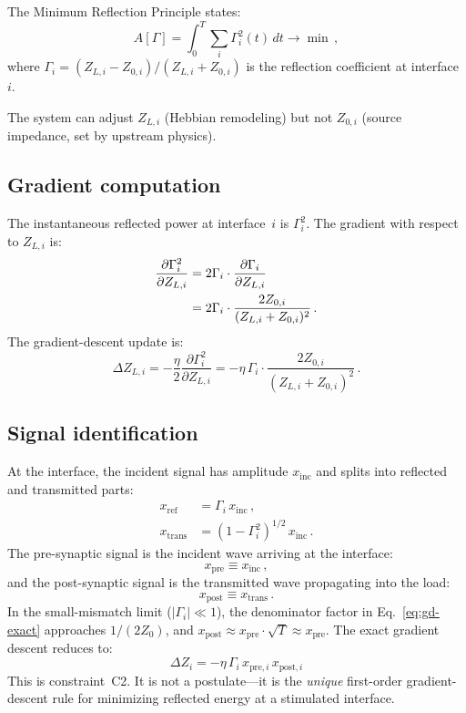 \documentclass[aps,pre,twocolumn,superscriptaddress,floatfix]{revtex4-2}
\begin{document}
The Minimum Reflection Principle states:
\begin{equation}
  A[\Gamma] = \int_0^T \sum_i \Gamma_i^2(t)\,dt \to \min\,,
  \label{eq:MRP}
\end{equation}
where $\Gamma_i = (Z_{L,i} - Z_{0,i})/(Z_{L,i} + Z_{0,i})$
is the reflection coefficient at interface~$i$.

The system can adjust $Z_{L,i}$ (Hebbian remodeling) but not
$Z_{0,i}$ (source impedance, set by upstream physics).

\subsection{Gradient computation}

The instantaneous reflected power at interface~$i$ is
$\Gamma_i^2$.  The gradient with respect to
$Z_{L,i}$ is:
\begin{align}
  \frac{\partial \Gamma_i^2}{\partial Z_{L,i}}
  &= 2\Gamma_i \cdot \frac{\partial \Gamma_i}{\partial Z_{L,i}} \notag \\
  &= 2\Gamma_i \cdot \frac{2Z_{0,i}}{(Z_{L,i}+Z_{0,i})^2}\,.
  \label{eq:gradient}
\end{align}
The gradient-descent update is:
\begin{equation}
  \Delta Z_{L,i} = -\frac{\eta}{2}
    \frac{\partial \Gamma_i^2}{\partial Z_{L,i}}
  = -\eta\,\Gamma_i \cdot
    \frac{2Z_{0,i}}{(Z_{L,i}+Z_{0,i})^2}\,.
  \label{eq:gd-exact}
\end{equation}

\subsection{Signal identification}

At the interface, the incident signal has amplitude
$x_{\text{inc}}$ and splits into reflected and
transmitted parts:
\begin{align}
  x_{\text{ref}} &= \Gamma_i \, x_{\text{inc}}\,, \\
  x_{\text{trans}} &= (1-\Gamma_i^2)^{1/2}\, x_{\text{inc}}\,.
\end{align}
The pre-synaptic signal is the incident wave arriving
at the interface:
\begin{equation}
  x_{\text{pre}} \equiv x_{\text{inc}}\,,
\end{equation}
and the post-synaptic signal is the transmitted wave
propagating into the load:
\begin{equation}
  x_{\text{post}} \equiv x_{\text{trans}}\,.
\end{equation}
In the small-mismatch limit ($|\Gamma_i| \ll 1$), the
denominator factor in Eq.~\eqref{eq:gd-exact} approaches
$1/(2Z_0)$, and $x_{\text{post}} \approx x_{\text{pre}}
\cdot \sqrt{T} \approx x_{\text{pre}}$.  The exact
gradient descent reduces to:
\begin{equation}
  \boxed{\Delta Z_i = -\eta\,\Gamma_i\,
    x_{\text{pre},i}\,x_{\text{post},i}}
  \label{eq:C2}
\end{equation}
This is constraint~C2.  It is not a postulate---it is
the \emph{unique} first-order gradient-descent rule for
minimizing reflected energy at a stimulated interface.
\end{document}
